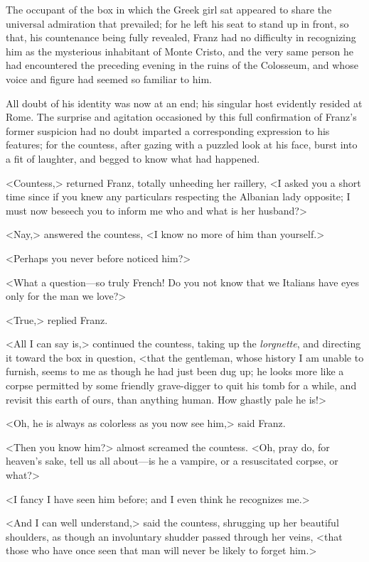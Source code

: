  The occupant of the box in which the Greek girl sat appeared to share the universal admiration that prevailed; for he left his seat to stand up in front, so that, his countenance being fully revealed, Franz had no difficulty in recognizing him as the mysterious inhabitant of Monte Cristo, and the very same person he had encountered the preceding evening in the ruins of the Colosseum, and whose voice and figure had seemed so familiar to him. 

 All doubt of his identity was now at an end; his singular host evidently resided at Rome. The surprise and agitation occasioned by this full confirmation of Franz's former suspicion had no doubt imparted a corresponding expression to his features; for the countess, after gazing with a puzzled look at his face, burst into a fit of laughter, and begged to know what had happened. 

 <Countess,> returned Franz, totally unheeding her raillery, <I asked you a short time since if you knew any particulars respecting the Albanian lady opposite; I must now beseech you to inform me who and what is her husband?> 

 <Nay,> answered the countess, <I know no more of him than yourself.> 

 <Perhaps you never before noticed him?> 

 <What a question—so truly French! Do you not know that we Italians have eyes only for the man we love?> 

 <True,> replied Franz. 

 <All I can say is,> continued the countess, taking up the \textit{lorgnette}, and directing it toward the box in question, <that the gentleman, whose history I am unable to furnish, seems to me as though he had just been dug up; he looks more like a corpse permitted by some friendly grave-digger to quit his tomb for a while, and revisit this earth of ours, than anything human. How ghastly pale he is!> 

 <Oh, he is always as colorless as you now see him,> said Franz. 

 <Then you know him?> almost screamed the countess. <Oh, pray do, for heaven's sake, tell us all about—is he a vampire, or a resuscitated corpse, or what?> 

 <I fancy I have seen him before; and I even think he recognizes me.> 

 <And I can well understand,> said the countess, shrugging up her beautiful shoulders, as though an involuntary shudder passed through her veins, <that those who have once seen that man will never be likely to forget him.> 

